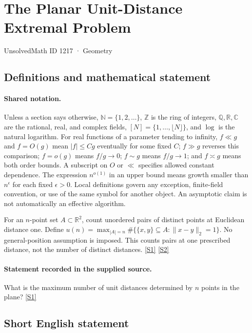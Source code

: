 \documentclass[11pt,a4paper]{article}
\newcommand{\N}{\mathbb{N}}
\newcommand{\Z}{\mathbb{Z}}
\newcommand{\Q}{\mathbb{Q}}
\newcommand{\R}{\mathbb{R}}
\newcommand{\C}{\mathbb{C}}
\newcommand{\sref}[2]{\hyperlink{source:#1:#2}{[S#2]}}
\begin{document}

\setcounter{section}{1216}

\section{The Planar Unit-Distance Extremal Problem}\label{1217}

{\small\sffamily UnsolvedMath ID 1217 · Geometry}

\subsection{Definitions and mathematical statement}

\paragraph{Shared notation.}Unless a section says otherwise, $\N=\{1,2,\ldots\}$,
$\Z$ is the ring of integers, $\Q,\R,\C$ are the rational, real, and complex
fields, $[N]=\{1,\ldots,\lfloor N\rfloor\}$, and $\log$ is the natural
logarithm. For real functions of a parameter tending to infinity,
$f\ll g$ and $f=O(g)$ mean $|f|\leq Cg$ eventually for some fixed $C$;
$f\gg g$ reverses this comparison; $f=o(g)$ means $f/g\to0$;
$f\sim g$ means $f/g\to1$; and $f\asymp g$ means both order bounds.
A subscript on $O$ or $\ll$ specifies allowed constant dependence.
The expression $n^{o(1)}$ in an upper bound means growth smaller than
$n^\epsilon$ for each fixed $\epsilon>0$. Local definitions govern any
exception, finite-field convention, or use of the same symbol for another
object. An asymptotic claim is not automatically an effective algorithm.



For an $n$-point set $A\subset\R^2$, count unordered pairs of distinct points at Euclidean distance one. Define $u(n)=\max_{|A|=n}\#\{\{x,y\}\subseteq A:\|x-y\|_2=1\}$. No general-position assumption is imposed. This counts pairs at one prescribed distance, not the number of distinct distances. \sref{1217}{1} \sref{1217}{2}

\paragraph{Statement recorded in the supplied source.}
What is the maximum number of unit distances determined by $n$ points in the plane? \sref{1217}{1}

\subsection{Short English statement}
\end{document}
